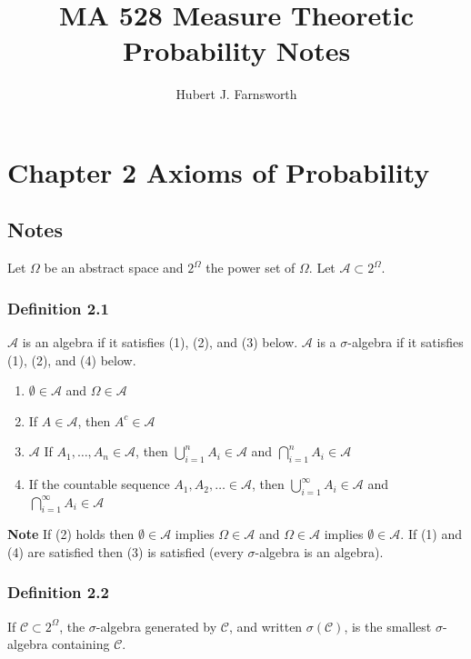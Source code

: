 \documentclass{article}
\title{MA 528 Measure Theoretic Probability Notes}
\author{Hubert J. Farnsworth}
\begin{document}
\maketitle

\section*{Chapter 2 Axioms of Probability}

\subsection*{Notes}

Let $\Omega$ be an abstract space and $2^\Omega$ the power set of $\Omega$. Let $\mathcal{A} \subset 2^\Omega$.

\subsubsection*{Definition 2.1} $\mathcal{A}$ is an algebra if it satisfies (1), (2), and (3) below. $\mathcal{A}$ is a $\sigma$-algebra if it satisfies (1), (2), and (4) below.

\begin{enumerate}
\item $\emptyset \in \mathcal{A}$ and $\Omega \in \mathcal{A}$
\item If $A \in \mathcal{A}$, then $A^c \in \mathcal{A}$
\item $\mathcal{A}$ If $A_1, \dots, A_n \in \mathcal{A}$, then $\bigcup_{i = 1}^n A_i \in \mathcal{A}$ and $\bigcap_{i = 1}^n A_i \in \mathcal{A}$
\item If the countable sequence $A_1, A_2, \dots \in \mathcal{A}$, then $\bigcup_{i = 1}^\infty A_i \in \mathcal{A}$ and $\bigcap_{i = 1}^\infty A_i \in \mathcal{A}$
\end{enumerate}

{\bf Note} If (2) holds then $\emptyset \in \mathcal{A}$ implies $\Omega \in \mathcal{A}$ and $\Omega \in \mathcal{A}$ implies $\emptyset \in \mathcal{A}$. If (1) and (4) are satisfied then (3) is satisfied (every $\sigma$-algebra is an algebra). \\

\subsubsection*{Definition 2.2} If $\mathcal{C} \subset 2^\Omega$, the $\sigma$-algebra generated by $\mathcal{C}$, and written $\sigma(\mathcal{C})$, is the smallest $\sigma$-algebra containing $\mathcal{C}$. \\
\end{document}
